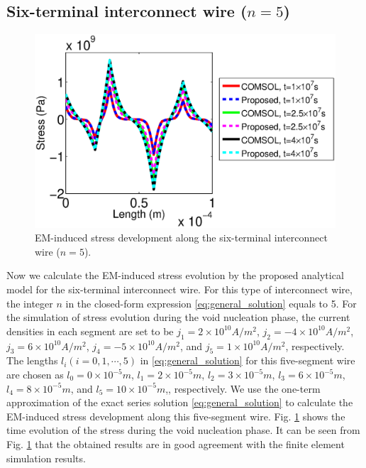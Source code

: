 \subsection{Six-terminal interconnect wire ($n=5$)}
\begin{figure}[!h]
\centering
\includegraphics[width=0.9\columnwidth]{S5StressMatComCompareT0.eps}
\caption{EM-induced stress development along the six-terminal interconnect wire ($n=5$).}
\label{fig:S5StressMatComCompare}
\end{figure}
Now we calculate the EM-induced stress evolution by the proposed analytical model for the six-terminal interconnect wire. For this type of interconnect wire, the integer $n$ in the closed-form expression \eqref{eq:general_solution} equals to 5. For the simulation of stress evolution during the void nucleation phase, the current densities in each segment are set to be $j_1=2\times 10^{10}A/m^2$, $j_2=-4\times 10^{10}A/m^2$, $j_3=6\times 10^{10}A/m^2$, $j_4=-5\times 10^{10}A/m^2$, and $j_5=1\times 10^{10}A/m^2$, respectively. The lengths $l_i(i=0,1,\cdots,5)$ in \eqref{eq:general_solution} for this five-segment wire are chosen as $l_0=0\times 10^{-5}m$, $l_1=2\times 10^{-5}m$, $l_2=3\times 10^{-5}m$, $l_3=6\times 10^{-5}m$, $l_4=8\times 10^{-5}m$, and $l_5=10\times 10^{-5}m$,, respectively. We use the one-term approximation of the exact series solution \eqref{eq:general_solution} to calculate the EM-induced stress development along this five-segment wire. Fig. \ref{fig:S5StressMatComCompare} shows the time evolution of the stress during the void nucleation phase. It can be seen from Fig. \ref{fig:S5StressMatComCompare} that the obtained results are in good agreement with the finite element simulation results. 

